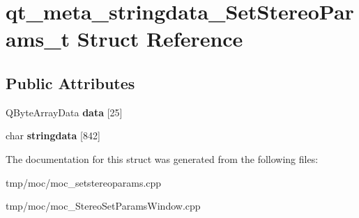 \hypertarget{structqt__meta__stringdata___set_stereo_params__t}{}\section{qt\+\_\+meta\+\_\+stringdata\+\_\+\+Set\+Stereo\+Params\+\_\+t Struct Reference}
\label{structqt__meta__stringdata___set_stereo_params__t}
\subsection*{Public Attributes}
\begin{DoxyCompactItemize}
\item 
Q\+Byte\+Array\+Data {\bfseries data} \mbox{[}25\mbox{]}\hypertarget{structqt__meta__stringdata___set_stereo_params__t_a25857eb28029d2512581336b539c537a}{}\label{structqt__meta__stringdata___set_stereo_params__t_a25857eb28029d2512581336b539c537a}

\item 
char {\bfseries stringdata} \mbox{[}842\mbox{]}\hypertarget{structqt__meta__stringdata___set_stereo_params__t_a5a88229ab18256cef34e6608d64a7850}{}\label{structqt__meta__stringdata___set_stereo_params__t_a5a88229ab18256cef34e6608d64a7850}

\end{DoxyCompactItemize}


The documentation for this struct was generated from the following files\+:\begin{DoxyCompactItemize}
\item 
tmp/moc/moc\+\_\+setstereoparams.\+cpp\item 
tmp/moc/moc\+\_\+\+Stereo\+Set\+Params\+Window.\+cpp\end{DoxyCompactItemize}
